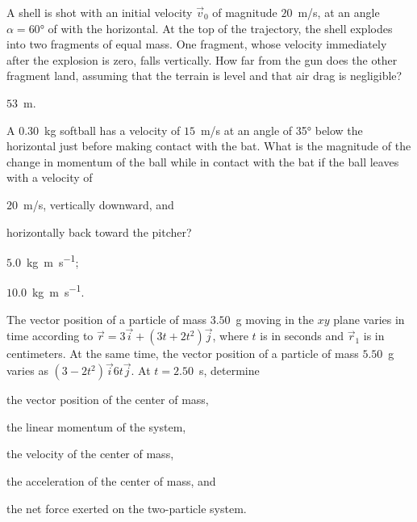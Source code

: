 \begin{problem}
	A shell is shot with an initial velocity $\vec v_0$ of magnitude $20$~m/s, at an angle $\alpha = \ang{60}$ of with the horizontal. At the top of the trajectory, the shell explodes into two fragments of equal mass. One fragment, whose velocity immediately after the explosion is zero, falls vertically. How far from the gun does the other fragment land, assuming that the terrain is level and that air drag is negligible?
	\begin{solution}
		$53$~m.
	\end{solution}
\end{problem}

\begin{problem}
	A $0.30$~kg softball has a velocity of $15$~m/s at an angle of \ang{35} below the horizontal just before making contact with the bat. What is the magnitude of the change in momentum of the ball while in contact with the bat if the ball leaves with a velocity of 
	\begin{enumerate*}[label=(\alph*)]
		\item $20$~m/s, vertically downward, and
		\item horizontally back toward the pitcher?
	\end{enumerate*}
	\begin{solution}
		\begin{enumerate*}[label=(\alph*)]
			\item $5.0$~\si{\kilo\gram\meter\per\second};
			\item  $10.0$~\si{\kilo\gram\meter\per\second}.
		\end{enumerate*}
	\end{solution}
\end{problem}


\begin{problem}
	The vector position of a particle of mass $3.50$~g  moving in the $xy$ plane varies in time according to $\vec r = 3\vec i + (3 t +2t^2) \vec j$, where $t$ is in seconds and $\vec r_1$ is in centimeters. At the same time, the vector position of a  particle of mass $5.50$~g varies as $(3-2t^2) \vec i 6t \vec j$. At $t = 2.50$~s, determine
	\begin{enumerate*}[label=(\alph*)]
		\item the vector position of the center of mass,
		\item the linear momentum of the system,
		\item the velocity of the center of mass,
		\item the acceleration of the center of mass,
		and
		\item the net force exerted on the two-particle system.
	\end{enumerate*}
	\begin{solution}
		
	\end{solution}
\end{problem}


